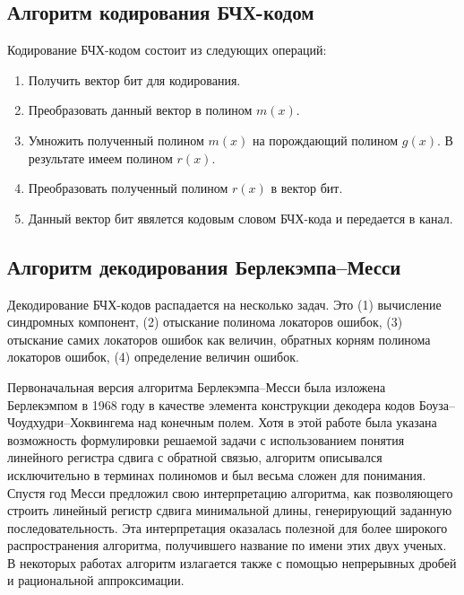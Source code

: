 \subsection{Алгоритм кодирования БЧХ-кодом}
Кодирование БЧХ-кодом состоит из следующих операций:
\begin{enumerate}
  \item Получить вектор бит для кодирования.
  \item Преобразовать данный вектор в полином $m(x)$.
  \item Умножить полученный полином $m(x)$ на порождающий полином $g(x)$. В результате имеем полином $r(x)$.
  \item Преобразовать полученный полином $r(x)$ в вектор бит.
  \item Данный вектор бит явялется кодовым словом БЧХ-кода и передается в канал.
\end{enumerate}

\subsection{Алгоритм декодирования Берлекэмпа–Месси}
Декодирование БЧХ-кодов распадается на несколько задач. Это (1) вычисление синдромных компонент, (2) 
отыскание полинома локаторов ошибок, (3) отыскание самих локаторов ошибок как величин, обратных корням 
полинома локаторов ошибок, (4) определение величин ошибок.

Первоначальная версия алгоритма Берлекэмпа–Месси была изложена Берлекэмпом в 1968 году в качестве 
элемента конструкции декодера кодов Боуза–Чоудхудри–Хоквингема над конечным полем. Хотя в этой работе была 
указана возможность формулировки решаемой задачи с использованием понятия линейного регистра сдвига с 
обратной связью, алгоритм описывался исключительно в терминах полиномов и был весьма сложен для понимания. 
Спустя год Месси предложил свою интерпретацию алгоритма, как позволяющего строить линейный регистр сдвига 
минимальной длины, генерирующий заданную последовательность. Эта интерпретация оказалась полезной для более 
широкого распространения алгоритма, получившего название по имени этих двух ученых. В некоторых работах 
алгоритм излагается также с помощью непрерывных дробей и рациональной аппроксимации.

